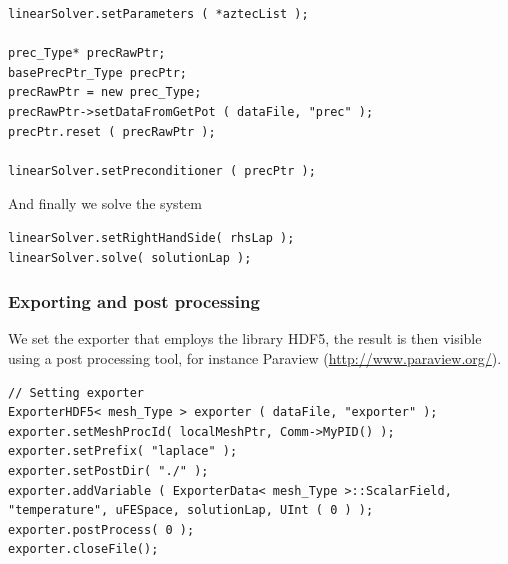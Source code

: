 \begin{itemize}
\begin{lstlisting}
linearSolver.setParameters ( *aztecList );

prec_Type* precRawPtr;
basePrecPtr_Type precPtr;
precRawPtr = new prec_Type;
precRawPtr->setDataFromGetPot ( dataFile, "prec" );
precPtr.reset ( precRawPtr );

linearSolver.setPreconditioner ( precPtr );
\end{lstlisting}
And finally we solve the system
\begin{lstlisting}
linearSolver.setRightHandSide( rhsLap );
linearSolver.solve( solutionLap );
\end{lstlisting}



\subsubsection*{Exporting and post processing}
We set the exporter that employs the library HDF5, the result is then visible using a post processing tool, for instance Paraview (\url{http://www.paraview.org/}).
\begin{lstlisting}
// Setting exporter
ExporterHDF5< mesh_Type > exporter ( dataFile, "exporter" );
exporter.setMeshProcId( localMeshPtr, Comm->MyPID() );
exporter.setPrefix( "laplace" );
exporter.setPostDir( "./" );
exporter.addVariable ( ExporterData< mesh_Type >::ScalarField, "temperature", uFESpace, solutionLap, UInt ( 0 ) );
exporter.postProcess( 0 );
exporter.closeFile();
\end{lstlisting}


\end{itemize}
